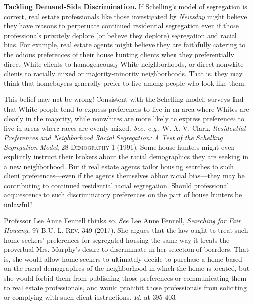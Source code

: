 \begin{questions}[]
\item \textbf{Tackling Demand-Side Discrimination.} If Schelling's model of
segregation is correct, real estate professionals like those investigated by
\textit{Newsday} might believe they have reasons to perpetuate continued
residential segregation even if those professionals privately deplore (or
believe they deplore) segregation and racial bias. For example, real estate
agents might believe they are faithfully catering to the odious preferences of
their house hunting clients when they preferentially direct White clients to
homogeneously White neighborhoods, or direct nonwhite clients to racially mixed
or majority-minority neighborhoods. That is, they may think that homebuyers
generally prefer to live among people who look like them. 

This belief may not be wrong! Consistent with the Schelling model, surveys find
that White people tend to express preferences to live in an area where Whites
are clearly in the majority, while nonwhites are more likely to express
preferences to live in areas where races are evenly mixed.  \textit{See, e.g.},
W. A. V. Clark, \textit{Residential Preferences and Neighborhood Racial
Segregation: A Test of the Schelling Segregation Model}, 28 \textsc{Demography}
1 (1991). Some house hunters might even explicitly instruct their brokers about
the racial demographics they are seeking in a new neighborhood. But if real
estate agents tailor housing searches to such client preferences---even if the
agents themselves abhor racial bias---they may be contributing to continued
residential racial segregation. Should professional acquiescence to such
discriminatory preferences on the part of house hunters be unlawful?

Professor Lee Anne Fennell thinks so. \textit{See} Lee Anne Fennell,
\textit{Searching for Fair Housing}, 97 \textsc{B.U. L. Rev}. 349 (2017). She
argues that the law ought to treat such home seekers' preferences for
segregated housing the same way it treats the proverbial Mrs. Murphy's desire
to discriminate in her selection of boarders. That is, she would allow home seekers to ultimately
decide to
purchase a home based on the racial demographics of the neighborhood in which
the home is located, but she would forbid them from publishing those
preferences or communicating them to real estate professionals, and would
prohibit those professionals from soliciting or complying with such client
instructions. \textit{Id.} at 395-403. 


\end{questions}
